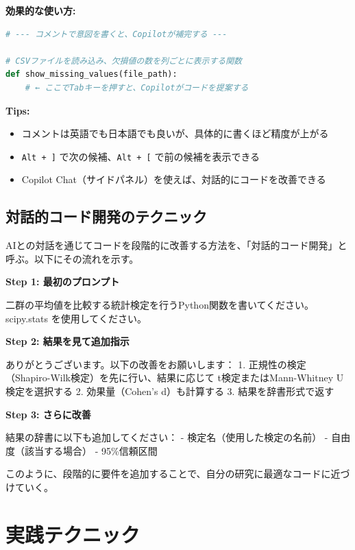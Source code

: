 \textbf{効果的な使い方:}

\begin{lstlisting}[language=Python]
# --- コメントで意図を書くと、Copilotが補完する ---

# CSVファイルを読み込み、欠損値の数を列ごとに表示する関数
def show_missing_values(file_path):
    # ← ここでTabキーを押すと、Copilotがコードを提案する
\end{lstlisting}

\textbf{Tips:}
\begin{itemize}
\item コメントは英語でも日本語でも良いが、具体的に書くほど精度が上がる
\item \texttt{Alt + ]} で次の候補、\texttt{Alt + [} で前の候補を表示できる
\item Copilot Chat（サイドパネル）を使えば、対話的にコードを改善できる
\end{itemize}

\subsection{対話的コード開発のテクニック}

AIとの対話を通じてコードを段階的に改善する方法を、「対話的コード開発」と呼ぶ。以下にその流れを示す。

\textbf{Step 1: 最初のプロンプト}
\begin{promptbox}
二群の平均値を比較する統計検定を行うPython関数を書いてください。
scipy.stats を使用してください。
\end{promptbox}

\textbf{Step 2: 結果を見て追加指示}
\begin{promptbox}
ありがとうございます。以下の改善をお願いします：
1. 正規性の検定（Shapiro-Wilk検定）を先に行い、結果に応じて
   t検定またはMann-Whitney U検定を選択する
2. 効果量（Cohen's d）も計算する
3. 結果を辞書形式で返す
\end{promptbox}

\textbf{Step 3: さらに改善}
\begin{promptbox}
結果の辞書に以下も追加してください：
- 検定名（使用した検定の名前）
- 自由度（該当する場合）
- 95\%信頼区間
\end{promptbox}

このように、段階的に要件を追加することで、自分の研究に最適なコードに近づけていく。

\section{実践テクニック}
\label{sec:6.4}

